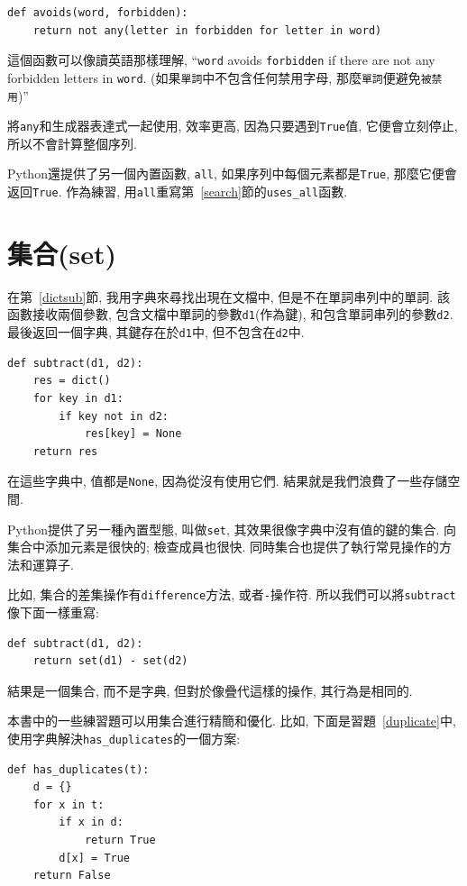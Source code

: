 \documentclass[10pt]{book}
\begin{document}
\begin{verbatim}
def avoids(word, forbidden):
    return not any(letter in forbidden for letter in word)
\end{verbatim}
%
這個函數可以像讀英語那樣理解, ``{\tt word} avoids
{\tt forbidden} if there are not any forbidden letters in {\tt word}.
(如果{\tt 單詞}中不包含任何禁用字母, 那麼{\tt 單詞}便避免{\tt 被禁用})''

將{\tt any}和生成器表達式一起使用, 效率更高, 因為只要遇到{\tt True}值, 它便會立刻停止, 
所以不會計算整個序列. 

Python還提供了另一個內置函數, {\tt all}, 如果序列中每個元素都是{\tt True}, 
那麼它便會返回{\tt True}.
作為練習, 用{\tt all}重寫第~\ref{search}節的\verb"uses_all"函數.


\section{集合(set)}
\label{sets}

在第~\ref{dictsub}節, 我用字典來尋找出現在文檔中, 但是不在單詞串列中的單詞. 
該函數接收兩個參數, 包含文檔中單詞的參數{\tt d1}(作為鍵),  和包含單詞串列的參數{\tt d2}. 
最後返回一個字典, 其鍵存在於{\tt d1}中, 但不包含在{\tt d2}中. 

\begin{verbatim}
def subtract(d1, d2):
    res = dict()
    for key in d1:
        if key not in d2:
            res[key] = None
    return res
\end{verbatim}
%
在這些字典中, 值都是{\tt None}, 因為從沒有使用它們. 
結果就是我們浪費了一些存儲空間. 

Python提供了另一種內置型態, 叫做{\tt set}, 
其效果很像字典中沒有值的鍵的集合. 
向集合中添加元素是很快的; 檢查成員也很快. 
同時集合也提供了執行常見操作的方法和運算子. 

比如, 集合的差集操作有{\tt difference}方法, 或者{\tt -}操作符. 
所以我們可以將{\tt subtract}像下面一樣重寫:

\begin{verbatim}
def subtract(d1, d2):
    return set(d1) - set(d2)
\end{verbatim}
%
結果是一個集合, 而不是字典, 
但對於像疊代這樣的操作, 其行為是相同的. 

本書中的一些練習題可以用集合進行精簡和優化. 
比如, 下面是習題~\ref{duplicate}中, 使用字典解決\verb"has_duplicates"的一個方案:

\begin{verbatim}
def has_duplicates(t):
    d = {}
    for x in t:
        if x in d:
            return True
        d[x] = True
    return False
\end{verbatim}
\end{document}
